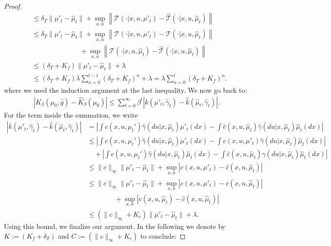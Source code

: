 \documentclass[twoside,11pt]{article}
\begin{document}
\begin{proof}
\begin{align*}
&\leq \delta_T \|\mu'_t - \hat{\mu}_t\| +  \sup_{x,u}\left\|{\mathcal{T}}(\cdot|x,u,\mu'_t)  -  \hat{\mathcal{T}}(\cdot|x,u,\hat{\mu}_t)\right\|\\
& \leq  \delta_T \|\mu'_t - \hat{\mu}_t\| +  \sup_{x,u}\left\|{\mathcal{T}}(\cdot|x,u,\mu'_t)  -  {\mathcal{T}}(\cdot|x,u,\hat{\mu}_t)\right\| \\
& \qquad \qquad\qquad \quad +   \sup_{x,u}\left\|{\mathcal{T}}(\cdot|x,u,\hat{\mu}_t)  -  \hat{\mathcal{T}}(\cdot|x,u,\hat{\mu}_t)\right\|   \\
& \leq (\delta_T + K_f) \|\mu'_t - \hat{\mu}_t\| + \lambda \\
& \leq (\delta_T + K_f)  \lambda \sum_{n=0}^{t-1}(\delta_T + K_f)^n  +\lambda  =  \lambda \sum_{n=0}^{t} (\delta_T + K_f)^n.
\end{align*}
where we used the induction argument at the last inequality.  We now go back to:
\begin{align*}
 \left| K_\beta(\mu_0,\hat{g})  - \hat{K}_\beta(\mu_0)\right| \leq \sum_{t=0}^\infty \beta^t \left| k(\mu'_t,\hat{\gamma}_t) - \hat{k}(\hat{\mu}_t,\hat{\gamma}_t) \right|.
\end{align*}
For the term inside the summation, we write
\begin{align*}
\left| k(\mu'_t,\hat{\gamma}_t) - \hat{k}(\hat{\mu}_t,\hat{\gamma}_t) \right|& = \left| \int c(x,u,\mu_t')\hat{\gamma}(du|x,\hat{\mu}_t) \mu'_t(dx) - \int \hat{c}(x,u,\hat{\mu}_t)\hat{\gamma}(du|x,\hat{\mu}_t)\hat{\mu}_t(dx)\right|\\
&\leq  \left| \int c(x,u,\mu_t')\hat{\gamma}(du|x,\hat{\mu}_t) \mu'_t(dx) - \int {c}(x,u,\mu'_t)\hat{\gamma}(du|x,\hat{\mu}_t)\hat{\mu}_t(dx)\right|\\
& \quad +  \left| \int c(x,u,\mu_t')\hat{\gamma}(du|x,\hat{\mu}_t) \hat{\mu}_t(dx) - \int \hat{c}(x,u,\hat{\mu}_t)\hat{\gamma}(du|x,\hat{\mu}_t)\hat{\mu}_t(dx)\right|\\
&\leq \|c\|_\infty \|\mu'_t - \hat{\mu}_t\| + \sup_{x,u}\left| c(x,u,\mu'_t) - \hat{c}(x,u, \hat{\mu}_t) \right|\\
&\leq \|c\|_\infty \|\mu'_t - \hat{\mu}_t\| + \sup_{x,u}\left| c(x,u,\mu'_t) - c(x,u, \hat{\mu}_t) \right|\\
&\qquad\qquad + \sup_{x,u}\left| c(x,u, \hat{\mu}_t) - \hat{c}(x,u, \hat{\mu}_t) \right|\\
&\leq (\|c\|_\infty + K_c)  \|\mu'_t - \hat{\mu}_t\| + \lambda.
\end{align*}
Using this bound, we finalize our argument. In the following we denote by $K:= (K_f + \delta_T)$ and $C:=(\|c\|_\infty + K_c)$ to conclude:

\end{proof}
\end{document}

